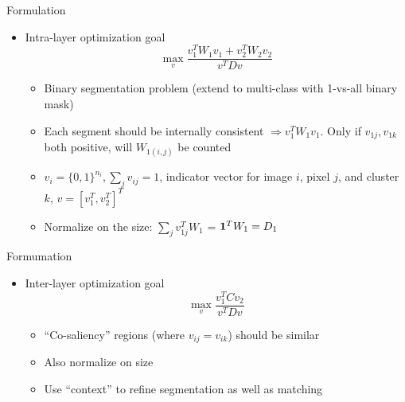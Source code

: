 \documentclass[12pt]{beamer}
\begin{document}
\begin{frame}{Formulation}
    \begin{itemize}
        \item Intra-layer optimization goal
        \[\max_v \frac{v_1^TW_1v_1 + v_2^TW_2v_2}{v^TDv}\]
        \begin{itemize}
            \item Binary segmentation problem (extend to multi-class with 1-vs-all binary mask)
            \item Each segment should be internally consistent $\Rightarrow v_1^TW_1v_1$. Only if $v_{1j}, v_{1k}$ both positive, will $W_{1(i,j)}$ be counted
            \item $v_{i} = \{0, 1\}^{n_i}, \sum_j v_{ij} = 1$, indicator vector for image $i$, pixel $j$, and cluster $k$, $v = [v_1^T, v_2^T]^T$
            \item Normalize on the size: $\sum_j v_{1j}^TW_1$ = ${\bf 1}^TW_1 = D_1$
        \end{itemize}
    \end{itemize}
\end{frame}

\begin{frame}{Formumation}
    \begin{itemize}
        \item Inter-layer optimization goal
        \[\max_v \frac{v_1^TCv_2}{v^TDv}\]
        \begin{itemize}
            \item ``Co-saliency'' regions (where $v_{ij} = v_{ik}$) should be similar
            \item Also normalize on size
            \item Use ``context'' to refine segmentation as well as matching
        \end{itemize}
    \end{itemize}
\end{frame}
\end{document}
